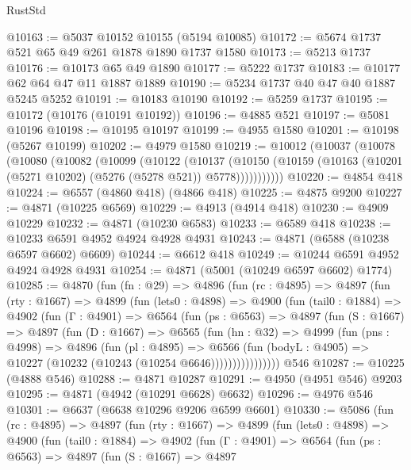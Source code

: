 \begin{lexlean}{RustStd}
\begin{coremodule}
{\begin{coremodule}
{{{{{{{{{{{{{{{{{{{{{{{{{{{{{@10163 := @5037 @10152 @10155 (@5194 @10085)
@10172 := @5674 @1737 @521 @65 @49 @261 @1878 @1890 @1737 @1580
@10173 := @5213 @1737
@10176 := @10173 @65 @49 @1890
@10177 := @5222 @1737
@10183 := @10177 @62 @64 @47 @11 @1887 @1889
@10190 := @5234 @1737 @40 @47 @40 @1887 @5245 @5252
@10191 := @10183 @10190
@10192 := @5259 @1737
@10195 := @10172 (@10176 (@10191 @10192))
@10196 := @4885 @521
@10197 := @5081 @10196
@10198 := @10195 @10197
@10199 := @4955 @1580
@10201 := @10198 (@5267 @10199)
@10202 := @4979 @1580
@10219 := @10012
    (@10037
      (@10078
        (@10080
          (@10082
            (@10099
              (@10122
                (@10137
                  (@10150
                    (@10159 (@10163 (@10201 (@5271 @10202) (@5276 (@5278 @521)) @5778)))))))))))
@10220 := @4854 @418
@10224 := @6557 (@4860 @418) (@4866 @418)
@10225 := @4875 @9200
@10227 := @4871 (@10225 @6569)
@10229 := @4913 (@4914 @418)
@10230 := @4909 @10229
@10232 := @4871 (@10230 @6583)
@10233 := @6589 @418
@10238 := @10233 @6591 @4952 @4924 @4928 @4931
@10243 := @4871 (@6588 (@10238 @6597 @6602) @6609)
@10244 := @6612 @418
@10249 := @10244 @6591 @4952 @4924 @4928 @4931
@10254 := @4871 (@5001 (@10249 @6597 @6602) @1774)
@10285 := @4870
    (fun (fn : @29) =>
    @4896
      (fun (rc : @4895) =>
      @4897
        (fun (rty : @1667) =>
        @4899
          (fun (lets0 : @4898) =>
          @4900
            (fun (tail0 : @1884) =>
            @4902
              (fun (Γ : @4901) =>
              @6564
                (fun (ps : @6563) =>
                @4897
                  (fun (S : @1667) =>
                  @4897
                    (fun (D : @1667) =>
                    @6565
                      (fun (hn : @32) =>
                      @4999
                        (fun (pns : @4998) =>
                        @4896
                          (fun (pl : @4895) =>
                          @6566
                            (fun (bodyL : @4905) =>
                            @10227 (@10232 (@10243 (@10254 @6646))))))))))))))))
    @546
@10287 := @10225 (@4888 @546)
@10288 := @4871 @10287
@10291 := @4950 (@4951 @546) @9203
@10295 := @4871 (@4942 (@10291 @6628) @6632)
@10296 := @4976 @546
@10301 := @6637 (@6638 @10296 @9206 @6599 @6601)
@10330 := @5086
    (fun (rc : @4895) =>
    @4897
      (fun (rty : @1667) =>
      @4899
        (fun (lets0 : @4898) =>
        @4900
          (fun (tail0 : @1884) =>
          @4902
            (fun (Γ : @4901) =>
            @6564
              (fun (ps : @6563) =>
              @4897
                (fun (S : @1667) =>
                @4897
}}}}}}}}}}}}}}}}}}}}}}}}}}}}}
\end{coremodule}}
\end{coremodule}
\end{lexlean}
